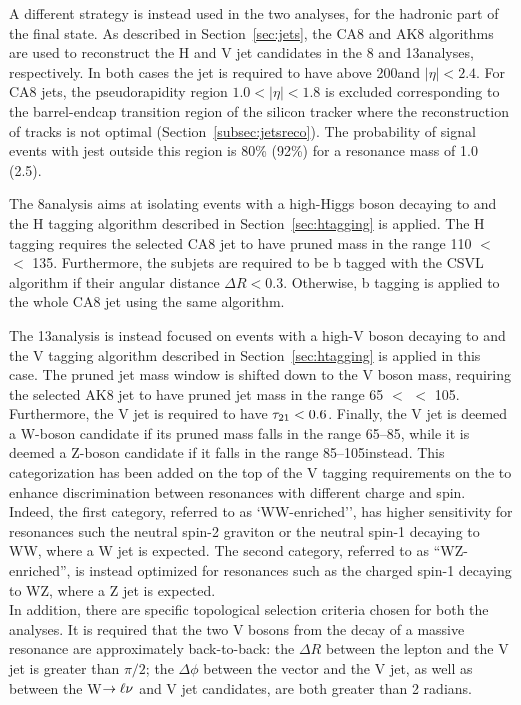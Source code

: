 A different strategy is instead used in the two analyses, for the hadronic part of the final state.
As described in Section~\ref{sec:jets}, the CA8 and AK8 algorithms are used to reconstruct the H and V jet candidates in the 8 and 13\TeV analyses, respectively.
In both cases the jet is required to have \pt above 200\GeV and $|\eta| < 2.4$. %
For CA8 jets, the pseudorapidity region $1.0 < |\eta| < 1.8$ is excluded corresponding to the barrel-endcap transition region of the silicon tracker where the reconstruction of tracks is not optimal (Section~\ref{subsec:jetsreco}).
The probability of signal events with jest outside this region is 80\% (92\%) for a resonance mass of 1.0 (2.5)\TeV.

The 8\TeV analysis aims at isolating events with a high-\pt Higgs boson decaying to \bbbar and the H tagging algorithm described in Section~\ref{sec:htagging} is applied.
The H tagging requires the selected CA8 jet to have pruned mass in the range 110 $<$ \mJ $<$ 135\GeV. Furthermore, the subjets are required to be b tagged with the CSVL algorithm if their angular distance $\Delta R < 0.3$.
Otherwise, b tagging is applied to the whole CA8 jet using the same algorithm.

The 13\TeV analysis is instead focused on events with a high-\pt V boson decaying to \qqbar and the V tagging algorithm described in Section~\ref{sec:htagging} is applied in this case.
The pruned jet mass window is shifted down to the V boson mass, requiring the selected AK8 jet to have pruned jet mass in the range 65 $<$ \mJ $<$ 105\GeV.
Furthermore, the V jet is required to have $\tau_{21} < 0.6$.
Finally, the V jet is deemed a W-boson candidate if its pruned mass falls in the range 65--85\GeV, while it is deemed a Z-boson candidate if it falls in the range 85--105\GeV instead.
This categorization has been added on the top of the V tagging requirements on the \mJ to enhance discrimination between resonances with different charge and spin. 
Indeed, the first category, referred to as  `WW-enriched'', has higher sensitivity for resonances such the neutral spin-2 graviton or the neutral spin-1 \Zpr decaying to WW, where a W jet is expected.
The second category, referred to as ``WZ-enriched'', is instead optimized for resonances such as the charged spin-1 \Wpr decaying to WZ, where a Z jet is expected.\\

In addition, there are specific topological selection criteria chosen for both the analyses. 
It is required that the two V bosons from the decay of a massive resonance are approximately back-to-back:
the $\Delta R$ between the lepton and the V jet is greater than $\pi/2$; the $\Delta\phi$ between the vector \VEtmiss and the V jet,
as well as between the W$\rightarrow\ell\nu$ and V jet candidates, are both greater than 2 radians.

